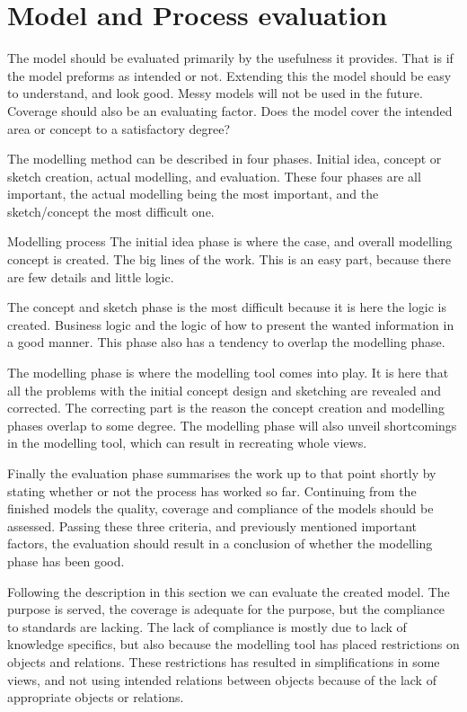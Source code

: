 \documentclass[12pt, a4paper]{article}
\begin{document}
\section{Model and Process evaluation}
The model should be evaluated primarily by the usefulness it provides. That is
if the model preforms as intended or not. Extending this the model should be
easy to understand, and look good. Messy models will not be used in the future.
Coverage should also be an evaluating factor. Does the model cover the intended
area or concept to a satisfactory degree?

The modelling method can be described in four phases.
Initial idea, concept or sketch creation, actual modelling, and evaluation.
These four phases are all important, the actual modelling being the most
important, and the sketch/concept the most difficult one.

Modelling process
The initial idea phase is where the case, and overall modelling concept is
created. The big lines of the work. This is an easy part, because there are few
details and little logic.

The concept and sketch phase is the most difficult because it is here the logic
is created. Business logic and the logic of how to present the wanted
information in a good manner. This phase also has a tendency to overlap the
modelling phase.

The modelling phase is where the modelling tool comes into play. It is here
that all the problems with the initial concept design and sketching are
revealed and corrected. The correcting part is the reason the concept creation
and
modelling phases overlap to some degree. The modelling phase will also unveil
shortcomings in the modelling tool, which can result in recreating whole views.

Finally the evaluation phase summarises the work up to that point shortly by
stating whether or not the process has worked so far. Continuing from the
finished models the quality, coverage and compliance of the models should be
assessed. Passing these three criteria, and previously mentioned important
factors, the evaluation should result in a conclusion of whether the modelling
phase has been good.


Following the description in this section we can evaluate the created model.
The purpose is served, the coverage is adequate for the purpose, but the
compliance to standards are lacking. The lack of compliance is mostly due to
lack of knowledge specifics, but also because the modelling tool has placed
restrictions on objects and relations. These restrictions has resulted in
simplifications in some views, and not using intended relations between objects
because of the lack of appropriate objects or relations. 
\end{document}
